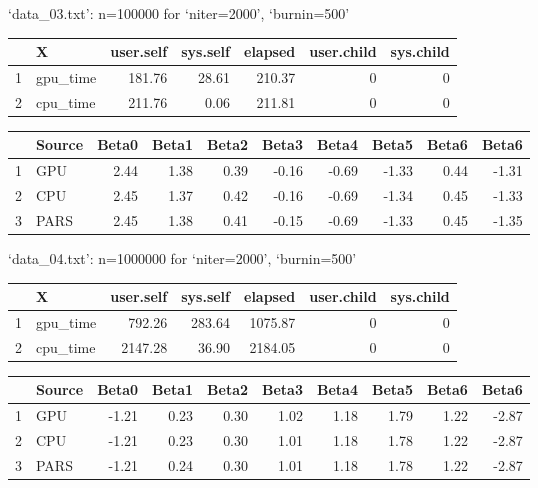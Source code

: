 \documentclass[a4paper, 11pt]{report}
\begin{document}
\begin{enumerate}[a)]
		    `data\_03.txt': n=100000 for `niter=2000', `burnin=500' 
			\begin{table}[H]
			\centering
			\begin{tabular}{rlrrrrr}
			  \hline
			 & X & user.self & sys.self & elapsed & user.child & sys.child \\ 
			  \hline
			1 & gpu\_time & 181.76 & 28.61 & 210.37 &   0 &   0 \\ 
			  2 & cpu\_time & 211.76 & 0.06 & 211.81 &   0 &   0 \\ 
			   \hline
			\end{tabular}
			\end{table}
			\begin{table}[H]
			\centering
			\begin{tabular}{rlrrrrrrrr}
			  \hline
			 & Source & Beta0 & Beta1 & Beta2 & Beta3 & Beta4 & Beta5 & Beta6 & Beta6 \\ 
			  \hline
			1 & GPU & 2.44 & 1.38 & 0.39 & -0.16 & -0.69 & -1.33 & 0.44 & -1.31 \\ 
			  2 & CPU & 2.45 & 1.37 & 0.42 & -0.16 & -0.69 & -1.34 & 0.45 & -1.33 \\ 
			  3 & PARS & 2.45 & 1.38 & 0.41 & -0.15 & -0.69 & -1.33 & 0.45 & -1.35 \\ 
			   \hline
			\end{tabular}
			\end{table}
			
		    `data\_04.txt': n=1000000 for `niter=2000', `burnin=500'
		    \begin{table}[H]
		    \centering
		    \begin{tabular}{rlrrrrr}
		      \hline
		     & X & user.self & sys.self & elapsed & user.child & sys.child \\ 
		      \hline
		    1 & gpu\_time & 792.26 & 283.64 & 1075.87 &   0 &   0 \\ 
		      2 & cpu\_time & 2147.28 & 36.90 & 2184.05 &   0 &   0 \\ 
		       \hline
		    \end{tabular}
		    \end{table}
		    \begin{table}[H]
		    \centering
		    \begin{tabular}{rlrrrrrrrr}
		      \hline
		     & Source & Beta0 & Beta1 & Beta2 & Beta3 & Beta4 & Beta5 & Beta6 & Beta6 \\ 
		      \hline
		    1 & GPU & -1.21 & 0.23 & 0.30 & 1.02 & 1.18 & 1.79 & 1.22 & -2.87 \\ 
		      2 & CPU & -1.21 & 0.23 & 0.30 & 1.01 & 1.18 & 1.78 & 1.22 & -2.87 \\ 
		      3 & PARS & -1.21 & 0.24 & 0.30 & 1.01 & 1.18 & 1.78 & 1.22 & -2.87 \\ 
		       \hline
		    \end{tabular}
		    \end{table}
		    

\end{enumerate}
\end{document}
